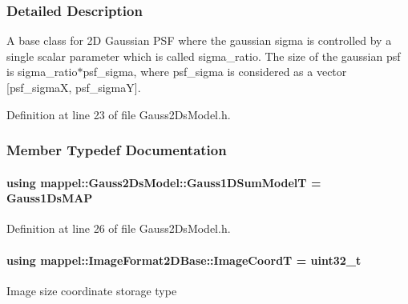 \subsubsection{Detailed Description}
A base class for 2D Gaussian P\+SF where the gaussian sigma is controlled by a single scalar parameter which is called sigma\+\_\+ratio. The size of the gaussian psf is sigma\+\_\+ratio$\ast$psf\+\_\+sigma, where psf\+\_\+sigma is considered as a vector \mbox{[}psf\+\_\+sigmaX, psf\+\_\+sigmaY\mbox{]}. 



Definition at line 23 of file Gauss2\+Ds\+Model.\+h.



\subsubsection{Member Typedef Documentation}
\paragraph[{\texorpdfstring{Gauss1\+D\+Sum\+ModelT}{Gauss1DSumModelT}}]{\setlength{\rightskip}{0pt plus 5cm}using {\bf mappel\+::\+Gauss2\+Ds\+Model\+::\+Gauss1\+D\+Sum\+ModelT} =  {\bf Gauss1\+Ds\+M\+AP}}\hypertarget{classmappel_1_1Gauss2DsModel_a23ae68443a62f76405e6f08f6dec4fb7}{}\label{classmappel_1_1Gauss2DsModel_a23ae68443a62f76405e6f08f6dec4fb7}


Definition at line 26 of file Gauss2\+Ds\+Model.\+h.

\paragraph[{\texorpdfstring{Image\+CoordT}{ImageCoordT}}]{\setlength{\rightskip}{0pt plus 5cm}using {\bf mappel\+::\+Image\+Format2\+D\+Base\+::\+Image\+CoordT} =  uint32\+\_\+t\hspace{0.3cm}{\ttfamily [inherited]}}\hypertarget{classmappel_1_1ImageFormat2DBase_a45e9234d63c357f34ca56c72c12b9e9c}{}\label{classmappel_1_1ImageFormat2DBase_a45e9234d63c357f34ca56c72c12b9e9c}
Image size coordinate storage type 

